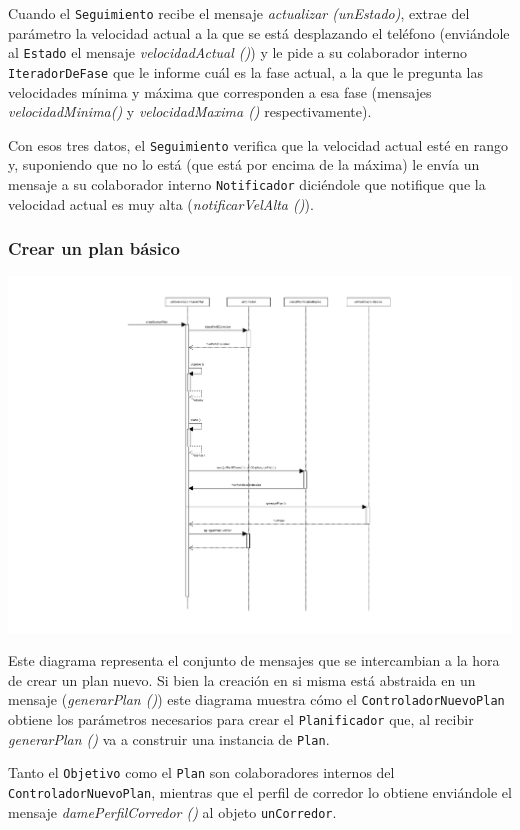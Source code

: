 Cuando el \texttt{Seguimiento} recibe el mensaje \emph{actualizar (unEstado)}, extrae del parámetro la velocidad actual a la que se está desplazando el teléfono (enviándole al \texttt{Estado} el mensaje \emph{velocidadActual ()}) y le pide a su colaborador interno \texttt{IteradorDeFase} que le informe cuál es la fase actual, a la que le pregunta las velocidades mínima y máxima que corresponden a esa fase (mensajes \emph{velocidadMinima()} y \emph{velocidadMaxima ()} respectivamente).

Con esos tres datos, el \texttt{Seguimiento} verifica que la velocidad actual esté en rango y, suponiendo que no lo está (que está por encima de la máxima) le envía un mensaje a su colaborador interno \texttt{Notificador} diciéndole que notifique que la velocidad actual es muy alta (\emph{notificarVelAlta ()}). 

\subsubsection{Crear un plan básico}
\begin{center}
	\includegraphics[scale=0.5]{images/PlanBasico.pdf}
\end{center}

Este diagrama representa el conjunto de mensajes que se intercambian a la hora de crear un plan nuevo. Si bien la creación en si misma está abstraida en un mensaje (\emph{generarPlan ()}) este diagrama muestra cómo el \texttt{ControladorNuevoPlan} obtiene los parámetros necesarios para crear el \texttt{Planificador} que, al recibir \emph{generarPlan ()} va a construir una instancia de \texttt{Plan}. 

Tanto el \texttt{Objetivo} como el \texttt{Plan} son colaboradores internos del \texttt{ControladorNuevoPlan}, mientras que el perfil de corredor lo obtiene enviándole el mensaje \emph{damePerfilCorredor ()} al objeto \texttt{unCorredor}.
